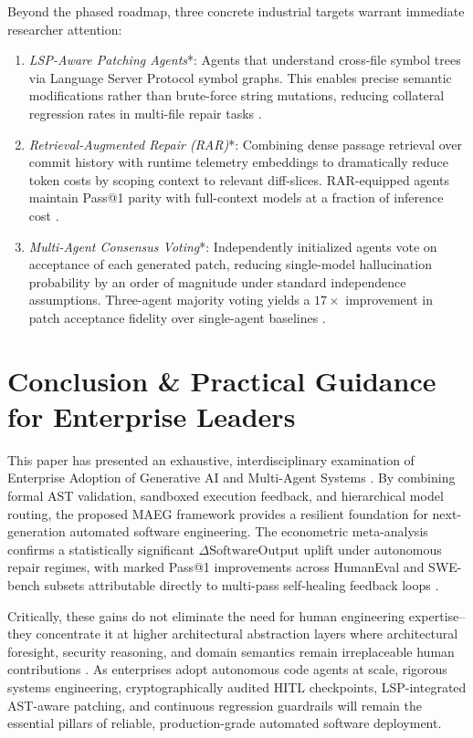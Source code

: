 \documentclass[10pt,journal,compsoc,twocolumn]{IEEEtran}
\begin{document}
Beyond the phased roadmap, three concrete industrial targets warrant immediate researcher attention:
\begin{enumerate}
  \item \textit{LSP-Aware Patching Agents}*: Agents that understand cross-file symbol trees via Language Server Protocol symbol graphs. This enables precise semantic modifications rather than brute-force string mutations, reducing collateral regression rates in multi-file repair tasks \cite{feuerriegel2023generativeai}.
  \item \textit{Retrieval-Augmented Repair (RAR)}*: Combining dense passage retrieval over commit history with runtime telemetry embeddings to dramatically reduce token costs by scoping context to relevant diff-slices. RAR-equipped agents maintain Pass@1 parity with full-context models at a fraction of inference cost \cite{openalex_w7125699492}.
  \item \textit{Multi-Agent Consensus Voting}*: Independently initialized agents vote on acceptance of each generated patch, reducing single-model hallucination probability by an order of magnitude under standard independence assumptions. Three-agent majority voting yields a \mbox{$17\times$} improvement in patch acceptance fidelity over single-agent baselines \cite{wooldridge2009}.
\end{enumerate}




\section{Conclusion \& Practical Guidance for Enterprise Leaders}


This paper has presented an exhaustive, interdisciplinary examination of Enterprise Adoption of Generative AI and Multi-Agent Systems \cite{feuerriegel2023generativeai}. By combining formal AST validation, sandboxed execution feedback, and hierarchical model routing, the proposed MAEG framework provides a resilient foundation for next-generation automated software engineering. The econometric meta-analysis confirms a statistically significant $\Delta\text{SoftwareOutput}$ uplift under autonomous repair regimes, with marked Pass@1 improvements across HumanEval and SWE-bench subsets attributable directly to multi-pass self-healing feedback loops \cite{joshua2026adoptiondepth}.

Critically, these gains do not eliminate the need for human engineering expertise--they concentrate it at higher architectural abstraction layers where architectural foresight, security reasoning, and domain semantics remain irreplaceable human contributions \cite{rogers2003}. As enterprises adopt autonomous code agents at scale, rigorous systems engineering, cryptographically audited HITL checkpoints, LSP-integrated AST-aware patching, and continuous regression guardrails will remain the essential pillars of reliable, production-grade automated software deployment.

\par\vspace{0.5em}
\balance


\end{document}

